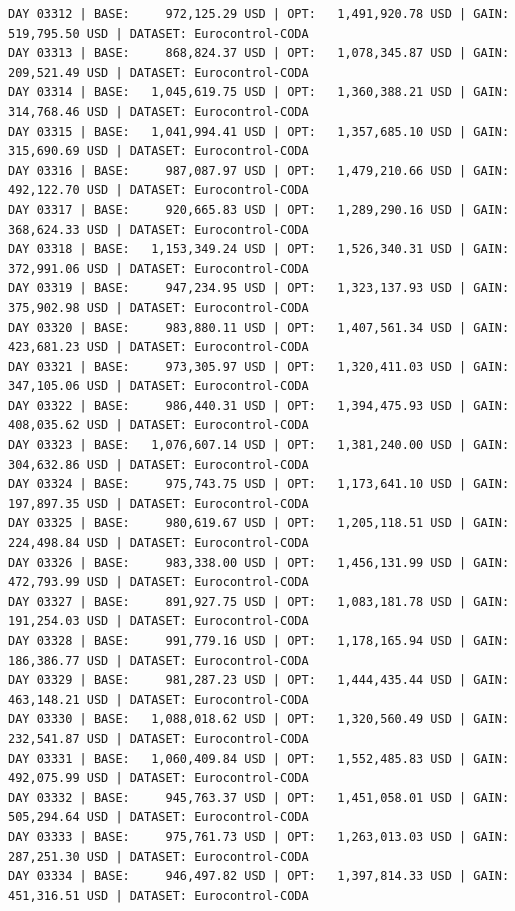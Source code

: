 \documentclass[11pt,a4paper]{article}
\begin{document}
\begin{verbatim}
DAY 03312 | BASE:     972,125.29 USD | OPT:   1,491,920.78 USD | GAIN: 519,795.50 USD | DATASET: Eurocontrol-CODA
DAY 03313 | BASE:     868,824.37 USD | OPT:   1,078,345.87 USD | GAIN: 209,521.49 USD | DATASET: Eurocontrol-CODA
DAY 03314 | BASE:   1,045,619.75 USD | OPT:   1,360,388.21 USD | GAIN: 314,768.46 USD | DATASET: Eurocontrol-CODA
DAY 03315 | BASE:   1,041,994.41 USD | OPT:   1,357,685.10 USD | GAIN: 315,690.69 USD | DATASET: Eurocontrol-CODA
DAY 03316 | BASE:     987,087.97 USD | OPT:   1,479,210.66 USD | GAIN: 492,122.70 USD | DATASET: Eurocontrol-CODA
DAY 03317 | BASE:     920,665.83 USD | OPT:   1,289,290.16 USD | GAIN: 368,624.33 USD | DATASET: Eurocontrol-CODA
DAY 03318 | BASE:   1,153,349.24 USD | OPT:   1,526,340.31 USD | GAIN: 372,991.06 USD | DATASET: Eurocontrol-CODA
DAY 03319 | BASE:     947,234.95 USD | OPT:   1,323,137.93 USD | GAIN: 375,902.98 USD | DATASET: Eurocontrol-CODA
DAY 03320 | BASE:     983,880.11 USD | OPT:   1,407,561.34 USD | GAIN: 423,681.23 USD | DATASET: Eurocontrol-CODA
DAY 03321 | BASE:     973,305.97 USD | OPT:   1,320,411.03 USD | GAIN: 347,105.06 USD | DATASET: Eurocontrol-CODA
DAY 03322 | BASE:     986,440.31 USD | OPT:   1,394,475.93 USD | GAIN: 408,035.62 USD | DATASET: Eurocontrol-CODA
DAY 03323 | BASE:   1,076,607.14 USD | OPT:   1,381,240.00 USD | GAIN: 304,632.86 USD | DATASET: Eurocontrol-CODA
DAY 03324 | BASE:     975,743.75 USD | OPT:   1,173,641.10 USD | GAIN: 197,897.35 USD | DATASET: Eurocontrol-CODA
DAY 03325 | BASE:     980,619.67 USD | OPT:   1,205,118.51 USD | GAIN: 224,498.84 USD | DATASET: Eurocontrol-CODA
DAY 03326 | BASE:     983,338.00 USD | OPT:   1,456,131.99 USD | GAIN: 472,793.99 USD | DATASET: Eurocontrol-CODA
DAY 03327 | BASE:     891,927.75 USD | OPT:   1,083,181.78 USD | GAIN: 191,254.03 USD | DATASET: Eurocontrol-CODA
DAY 03328 | BASE:     991,779.16 USD | OPT:   1,178,165.94 USD | GAIN: 186,386.77 USD | DATASET: Eurocontrol-CODA
DAY 03329 | BASE:     981,287.23 USD | OPT:   1,444,435.44 USD | GAIN: 463,148.21 USD | DATASET: Eurocontrol-CODA
DAY 03330 | BASE:   1,088,018.62 USD | OPT:   1,320,560.49 USD | GAIN: 232,541.87 USD | DATASET: Eurocontrol-CODA
DAY 03331 | BASE:   1,060,409.84 USD | OPT:   1,552,485.83 USD | GAIN: 492,075.99 USD | DATASET: Eurocontrol-CODA
DAY 03332 | BASE:     945,763.37 USD | OPT:   1,451,058.01 USD | GAIN: 505,294.64 USD | DATASET: Eurocontrol-CODA
DAY 03333 | BASE:     975,761.73 USD | OPT:   1,263,013.03 USD | GAIN: 287,251.30 USD | DATASET: Eurocontrol-CODA
DAY 03334 | BASE:     946,497.82 USD | OPT:   1,397,814.33 USD | GAIN: 451,316.51 USD | DATASET: Eurocontrol-CODA

\end{verbatim}
\end{document}
